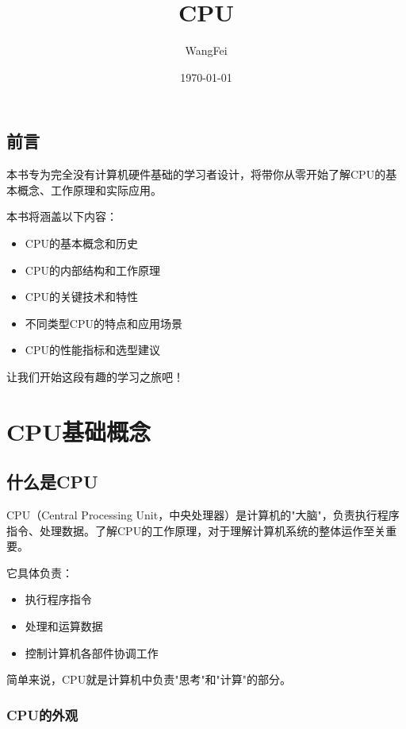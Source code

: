 \documentclass[12pt,UTF8]{ctexbook}
\title{\heiti\zihao{0} CPU}
\author{WangFei}
\date{\today}
\begin{document}
\maketitle
\tableofcontents

\frontmatter
\chapter{前言}

本书专为完全没有计算机硬件基础的学习者设计，将带你从零开始了解CPU的基本概念、工作原理和实际应用。

本书将涵盖以下内容：
\begin{itemize}
    \item CPU的基本概念和历史
    \item CPU的内部结构和工作原理
    \item CPU的关键技术和特性
    \item 不同类型CPU的特点和应用场景
    \item CPU的性能指标和选型建议
\end{itemize}

让我们开始这段有趣的学习之旅吧！

\mainmatter

\part{CPU基础概念}

\chapter{什么是CPU}

CPU（Central Processing Unit，中央处理器）是计算机的"大脑"，负责执行程序指令、处理数据。了解CPU的工作原理，对于理解计算机系统的整体运作至关重要。

它具体负责：

\begin{itemize}[leftmargin=2em]
    \item 执行程序指令
    \item 处理和运算数据
    \item 控制计算机各部件协调工作
\end{itemize}

简单来说，CPU就是计算机中负责"思考"和"计算"的部分。

\section{CPU的外观}
\end{document}
